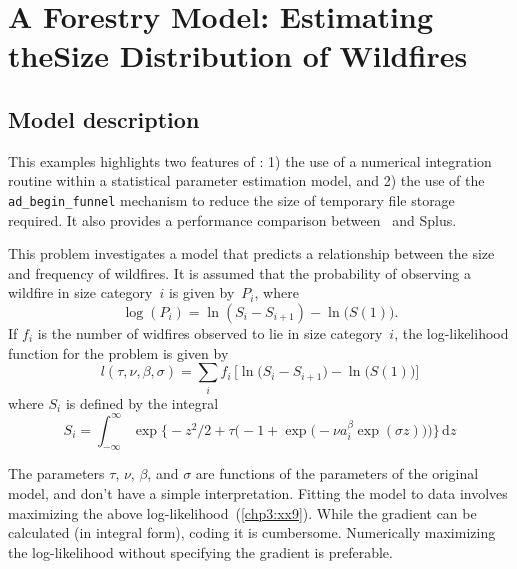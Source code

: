 \documentclass{admbmanual}
\begin{document}



\chapter{A Forestry Model: Estimating the\br Size Distribution of
 Wildfires}


\section{Model description}

This examples highlights two features of \ADM: 1) the use of a numerical
integration routine within a statistical parameter estimation model,
and 2) the use of the \texttt{ad\_begin\_funnel} mechanism to reduce the size
of temporary file storage required. It also provides a performance comparison between
\ADM\ and Splus.

This problem investigates a model that predicts a relationship
between the size and frequency of wildfires.
It is assumed that the probability of observing a wildfire
in size category~$i$ is given by~$P_i$, where
\begin{equation*}
  \log(P_i)=\ln\left(S_i-S_{i+1}\right)-\ln\big(S(1)\big).
\end{equation*}
If $f_i$ is the number of widfires observed to lie in
size category~$i$, the log-likelihood function for the problem is given by
\begin{equation}
  {
l(\tau,\nu,\beta,\sigma) = 
   \sum_i f_i\,\Big[\ln\big(S_i-S_{i+1}\big)-\ln\big(S(1)\big)\Big]}
\label{chp3:xx9}
\end{equation} 
where $S_i$ is defined by the integral
\begin{equation}
  {
S_i=\int_{-\infty}^\infty 
   \exp\Big\{-z^2/2 + 
  \tau\Big(-1+\exp\big(-\nu a_i^\beta\exp(\sigma z)\big)\Big) \Big\}\,\textrm{d}z}
\label{chp3:xx10}
\end{equation} 
 
The parameters $\tau$, $\nu$, $\beta$, and $\sigma$ are 
functions of the parameters of the original 
model, and don't have a simple interpretation. 
Fitting the model to 
data involves maximizing the above log-likelihood~(\ref{chp3:xx9}). %
  While the gradient can be 
calculated (in integral form), coding it is cumbersome.  Numerically maximizing 
the log-likelihood without specifying the gradient is preferable.  
\end{document}
